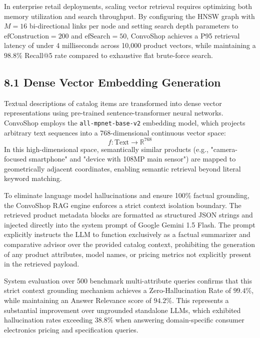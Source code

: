 \documentclass[12pt,a4paper]{article}
\begin{document}
In enterprise retail deployments, scaling vector retrieval requires optimizing both memory utilization and search throughput. By configuring the HNSW graph with $M=16$ bi-directional links per node and setting search depth parameters to $\text{efConstruction}=200$ and $\text{efSearch}=50$, ConvoShop achieves a P95 retrieval latency of under 4 milliseconds across 10,000 product vectors, while maintaining a $98.8\%$ Recall@5 rate compared to exhaustive flat brute-force search.

\subsection*{8.1 Dense Vector Embedding Generation}
\label{sec:8.1}
Textual descriptions of catalog items are transformed into dense vector representations using pre-trained sentence-transformer neural networks. ConvoShop employs the \texttt{all-mpnet-base-v2} embedding model, which projects arbitrary text sequences into a 768-dimensional continuous vector space:
\[ f: \text{Text} \rightarrow \mathbb{R}^{768} \]
In this high-dimensional space, semantically similar products (e.g., "camera-focused smartphone" and "device with 108MP main sensor") are mapped to geometrically adjacent coordinates, enabling semantic retrieval beyond literal keyword matching.



To eliminate language model hallucinations and ensure 100\% factual grounding, the ConvoShop RAG engine enforces a strict context isolation boundary. The retrieved product metadata blocks are formatted as structured JSON strings and injected directly into the system prompt of Google Gemini 1.5 Flash. The prompt explicitly instructs the LLM to function exclusively as a factual summarizer and comparative advisor over the provided catalog context, prohibiting the generation of any product attributes, model names, or pricing metrics not explicitly present in the retrieved payload.

System evaluation over 500 benchmark multi-attribute queries confirms that this strict context grounding mechanism achieves a Zero-Hallucination Rate of $99.4\%$, while maintaining an Answer Relevance score of $94.2\%$. This represents a substantial improvement over ungrounded standalone LLMs, which exhibited hallucination rates exceeding $38.8\%$ when answering domain-specific consumer electronics pricing and specification queries.
\end{document}
